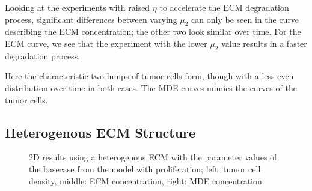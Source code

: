 Looking at the experiments with raised $\eta$ to accelerate the ECM degradation process, significant differences between varying $\mu_2$ can only be seen in the curve describing the ECM concentration; the other two look similar over time. For the ECM curve, we see that the experiment with the lower $\mu_2$ value results in a faster degradation process. 

Here the characteristic two lumps of tumor cells form, though with a less even distribution over time in both cases. The MDE curves mimics the curves of the tumor cells.



\subsection{Heterogenous ECM Structure}
\label{sec:2D_heterogenous_ECM}
\begin{figure}[h!]
 \centering
 \caption{2D results using a heterogenous ECM with the parameter values of the basecase from the model with proliferation; left: tumor cell density, middle: ECM concentration, right: MDE concentration.}
 \label{fig:2D_heterogenous_ECM}
\end{figure}

